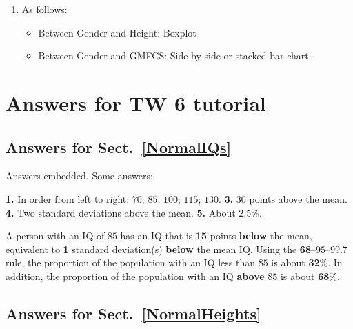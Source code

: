 \documentclass[
  11pt,
  a4paper,
  krantz2]{krantz}
\providecommand{\tightlist}{%
  \setlength{\itemsep}{0pt}\setlength{\parskip}{0pt}}
\begin{document}
\begin{footnotesize}
\begin{enumerate}
  \begin{itemize}
  \tightlist
  \item
    `Gender': Barchart (not really needed)
  \item
    `Age': Histogram/stemplot
  \item
    `Height': Histogram/stemplot
  \item
    `Weight': Histogram/stemplot
  \item
    `GMFCS': Barchart/piechart
  \end{itemize}
\item
  As follows:

  \begin{itemize}
  \tightlist
  \item
    Between Gender and Height: Boxplot
  \item
    Between Gender and GMFCS: Side-by-side or stacked bar chart.
  \end{itemize}
\end{enumerate}

\section{Answers for TW 6 tutorial}\label{Lecture6Answers}

\subsection*{Answers for Sect.~\ref{NormalIQs}}\label{answers-for-sect.-refnormaliqs}

Answers embedded.
Some answers:

\textbf{1.} In order from left to right: \(70\); \(85\); \(100\); \(115\); \(130\).
\textbf{3.} \(30\) points above the mean.
\textbf{4.} Two standard deviations above the mean.
\textbf{5.} About \(2.5\)\%.

A person with an IQ of \(85\) has an IQ that is \textbf{15} points \textbf{below} the mean, equivalent to \textbf{1} standard deviation(s) \textbf{below} the mean IQ.
Using the \textbf{68}--\(95\)--\(99.7\) rule, the proportion of the population with an IQ less than \(85\) is about \textbf{32}\%.
In addition, the proportion of the population with an IQ \textbf{above} \(85\) is about \textbf{68}\%.

\subsection*{Answers for Sect.~\ref{NormalHeights}}\label{answers-for-sect.-refnormalheights}


\end{footnotesize}
\end{document}
